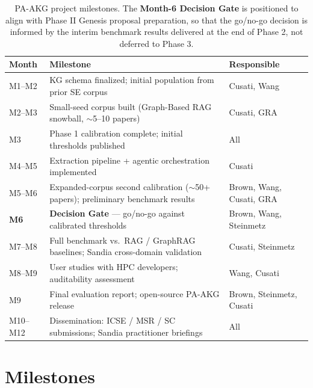 \documentclass{files/proposalnsf}
\begin{document}

\begin{table}[t]
\centering
\footnotesize
\begin{tabular}{|l|l|l|}
\hline
\textbf{Month} & \textbf{Milestone} & \textbf{Responsible} \\ \hline
M1--M2 & KG schema finalized; initial population from prior SE corpus & Cusati, Wang \\ \hline
M2--M3 & Small-seed corpus built (Graph-Based RAG snowball, $\sim$5--10 papers) & Cusati, GRA \\ \hline
M3 & Phase 1 calibration complete; initial thresholds published & All \\ \hline
M4--M5 & Extraction pipeline + agentic orchestration implemented & Cusati \\ \hline
M5--M6 & Expanded-corpus second calibration ($\sim$50+ papers); preliminary benchmark results & Brown, Wang, Cusati, GRA \\ \hline
\textbf{M6} & \textbf{Decision Gate} --- go/no-go against calibrated thresholds & Brown, Wang, Steinmetz \\ \hline
M7--M8 & Full benchmark vs.\ RAG / GraphRAG baselines; Sandia cross-domain validation & Cusati, Steinmetz \\ \hline
M8--M9 & User studies with HPC developers; auditability assessment & Wang, Cusati \\ \hline
M9 & Final evaluation report; open-source PA-AKG release & Brown, Steinmetz, Cusati \\ \hline
M10--M12 & Dissemination: ICSE / MSR / SC submissions; Sandia practitioner briefings & All \\ \hline
\end{tabular}
\caption{PA-AKG project milestones. The \textbf{Month-6 Decision Gate} is positioned to align with Phase II Genesis proposal preparation, so that the go/no-go decision is informed by the interim benchmark results delivered at the end of Phase 2, not deferred to Phase 3.}
\label{tab:milestones}
\end{table}

\section{Milestones}

\end{document}
